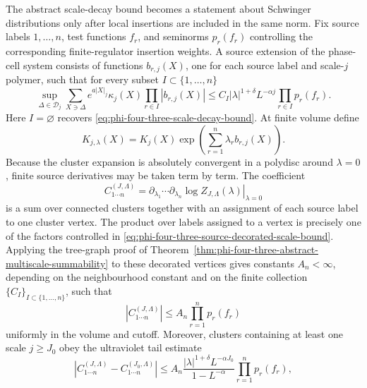 \begin{construction}
\label{con:phi-four-three-source-decorated-phase-cells}
The abstract scale-decay bound becomes a statement about Schwinger
distributions only after local insertions are included in the same norm.
Fix source labels \(1,\ldots,n\), test functions \(f_r\), and seminorms
\(p_r(f_r)\) controlling the corresponding finite-regulator insertion
weights.  A source extension of the phase-cell system consists of functions
\(b_{r,j}(X)\), one for each source label and scale-\(j\) polymer, such that
for every subset \(I\subset\{1,\ldots,n\}\)
\begin{equation}
  \sup_{\Delta\in\mathcal D_j}
  \sum_{X\ni\Delta}
  e^{a|X|_j}\kappa_j(X)
  \prod_{r\in I}|b_{r,j}(X)|
  \leq
  C_I |\lambda|^{1+\delta}L^{-\alpha j}
  \prod_{r\in I}p_r(f_r).
  \label{eq:phi-four-three-source-decorated-scale-bound}
\end{equation}
Here \(I=\varnothing\) recovers
\eqref{eq:phi-four-three-scale-decay-bound}.  At finite volume define
\[
  K_{j,\lambda}(X)
  =
  K_j(X)
  \exp\!\left(\sum_{r=1}^n\lambda_r b_{r,j}(X)\right).
\]
Because the cluster expansion is absolutely convergent in a polydisc
around \(\lambda=0\), finite source derivatives may be taken term by term.
The coefficient
\[
  C_{1\cdots n}^{(J,\Lambda)}
  =
  \left.
  \partial_{\lambda_1}\cdots\partial_{\lambda_n}
  \log Z_{J,\Lambda}(\lambda)
  \right|_{\lambda=0}
\]
is a sum over connected clusters together with an assignment of each source
label to one cluster vertex.  The product over labels assigned to a vertex
is precisely one of the factors controlled in
\eqref{eq:phi-four-three-source-decorated-scale-bound}.  Applying the
tree-graph proof of
Theorem~\ref{thm:phi-four-three-abstract-multiscale-summability} to these
decorated vertices gives constants \(A_n<\infty\), depending on the
neighbourhood constant and on the finite collection \(\{C_I\}_{I\subset
\{1,\ldots,n\}}\), such that
\begin{equation}
  |C_{1\cdots n}^{(J,\Lambda)}|
  \leq
  A_n
  \prod_{r=1}^n p_r(f_r)
  \label{eq:phi-four-three-source-seminorm-bound}
\end{equation}
uniformly in the volume and cutoff.  Moreover, clusters containing at least
one scale \(j\geq J_0\) obey the ultraviolet tail estimate
\begin{equation}
  |C_{1\cdots n}^{(J,\Lambda)}
    -C_{1\cdots n}^{(J_0,\Lambda)}|
  \leq
  A_n
  \frac{|\lambda|^{1+\delta}L^{-\alpha J_0}}
       {1-L^{-\alpha}}
  \prod_{r=1}^n p_r(f_r),

\end{equation}
\end{construction}
